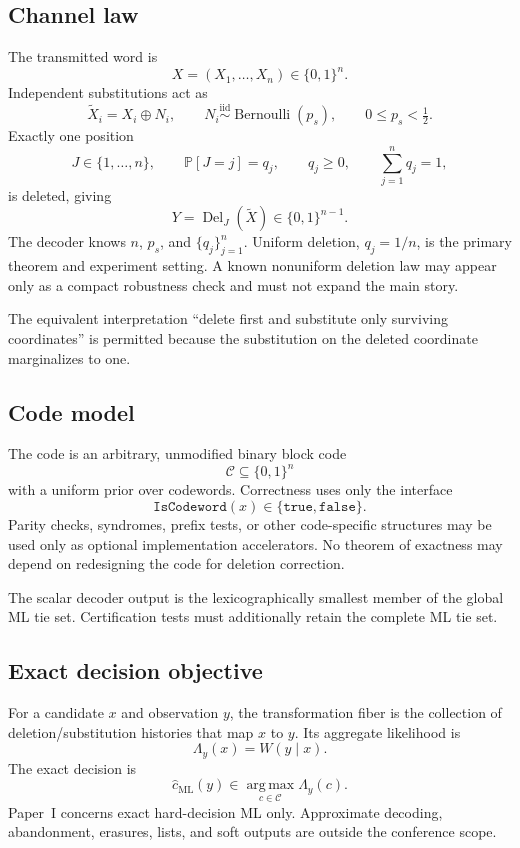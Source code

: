 \documentclass[11pt]{article}
\theoremstyle{definition}
\theoremstyle{remark}
\newcommand{\C}{\mathcal{C}}
\newcommand{\Prb}{\mathbb{P}}
\newcommand{\Del}{\operatorname{Del}}
\newcommand{\argmax}{\operatorname*{arg\,max}}
\begin{document}
\subsection{Channel law}
\label{sec:channel}

The transmitted word is
\[
X=(X_1,\ldots,X_n)\in\{0,1\}^n.
\]
Independent substitutions act as
\[
\widetilde X_i=X_i\oplus N_i,
\qquad
N_i\stackrel{\mathrm{iid}}{\sim}\operatorname{Bernoulli}(p_s),
\qquad 0\le p_s<\tfrac12.
\]
Exactly one position
\[
J\in\{1,\ldots,n\},
\qquad
\Prb[J=j]=q_j,
\qquad
q_j\ge0,
\qquad
\sum_{j=1}^n q_j=1,
\]
is deleted, giving
\[
Y=\Del_J(\widetilde X)\in\{0,1\}^{n-1}.
\]
The decoder knows $n$, $p_s$, and $\{q_j\}_{j=1}^n$. Uniform deletion, $q_j=1/n$, is the primary theorem and experiment setting. A known nonuniform deletion law may appear only as a compact robustness check and must not expand the main story.

The equivalent interpretation ``delete first and substitute only surviving coordinates'' is permitted because the substitution on the deleted coordinate marginalizes to one.

\subsection{Code model}

The code is an arbitrary, unmodified binary block code
\[
\C\subseteq\{0,1\}^n
\]
with a uniform prior over codewords. Correctness uses only the interface
\[
\texttt{IsCodeword}(x)\in\{\texttt{true},\texttt{false}\}.
\]
Parity checks, syndromes, prefix tests, or other code-specific structures may be used only as optional implementation accelerators. No theorem of exactness may depend on redesigning the code for deletion correction.

The scalar decoder output is the lexicographically smallest member of the global ML tie set. Certification tests must additionally retain the complete ML tie set.

\subsection{Exact decision objective}

For a candidate $x$ and observation $y$, the transformation fiber is the collection of deletion/substitution histories that map $x$ to $y$. Its aggregate likelihood is
\[
\Lambda_y(x)=W(y\mid x).
\]
The exact decision is
\[
\widehat c_{\mathrm{ML}}(y)
\in
\argmax_{c\in\C}\Lambda_y(c).
\]
Paper~I concerns exact hard-decision ML only. Approximate decoding, abandonment, erasures, lists, and soft outputs are outside the conference scope.
\end{document}
